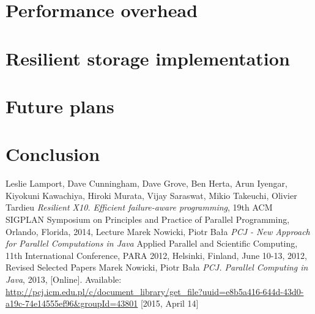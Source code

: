 \documentclass{llncs}
\begin{document}
\section{Performance overhead}

\section{Resilient storage implementation}

\section{Future plans}

\section{Conclusion}

\begin{thebibliography}{1}

Leslie Lamport, Dave Cunningham, Dave Grove, Ben Herta, Arun Iyengar, Kiyokuni Kawachiya, Hiroki Murata, Vijay Saraswat, Mikio Takeuchi, Olivier Tardieu
\emph{Resilient X10. Efficient failure-aware programming},
19th ACM SIGPLAN Symposium on Principles and Practice of Parallel Programming, Orlando, Florida, 2014, Lecture
Marek Nowicki, Piotr Bała
\emph{PCJ - New Approach for Parallel Computations in Java}
Applied Parallel and Scientific Computing, 11th International Conference, PARA 2012, Helsinki, Finland, June 10-13, 2012, Revised Selected Papers
Marek Nowicki, Piotr Bała
\emph{PCJ. Parallel Computing in Java}, 2013, [Online]. Available: \url{http://pcj.icm.edu.pl/c/document_library/get_file?uuid=e8b5a416-644d-43d0-a19c-74e14555ef96&groupId=43801} [2015, April 14]

\end{thebibliography}
\end{document}

